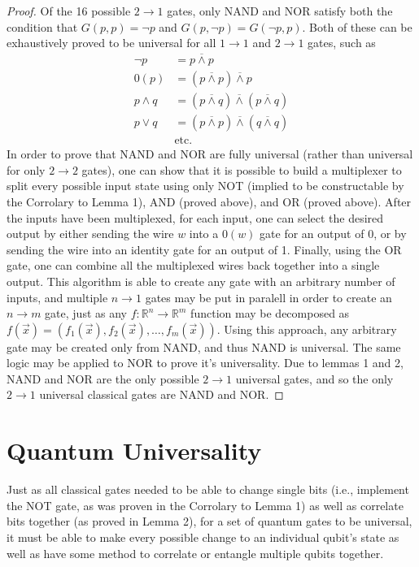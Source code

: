\documentclass[12pt]{article}
\newcommand{\nand}{\overline{\land}}
\begin{document}
\begin{proof}
    Of the 16 possible $2 \to 1$ gates, only NAND and NOR satisfy both the condition that $G(p, p) = \neg p$ and $G(p, \neg p) = G(\neg p, p)$.
    Both of these can be exhaustively proved to be universal for all $1 \to 1$ and $2 \to 1$ gates, such as
    \begin{align}
        \neg p &= p \nand p \\
        0(p) &= (p \nand p) \nand p \\
        p \land q &= (p \nand q) \nand (p \nand q) \\
        p \lor q &= (p \nand p) \nand (q \nand q) \\
        &\text{etc.}
    \end{align}
    In order to prove that NAND and NOR are fully universal (rather than universal for only $2 \to 2$ gates), one can show that it is possible to build a multiplexer to split every possible input state using only NOT (implied to be constructable by the Corrolary to Lemma 1), AND (proved above), and OR (proved above). After the inputs have been multiplexed, for each input, one can select the desired output by either sending the wire $w$ into a $0(w)$ gate for an output of 0, or by sending the wire into an identity gate for an output of 1. Finally, using the OR gate, one can combine all the multiplexed wires back together into a single output.
    This algorithm is able to create any gate with an arbitrary number of inputs, and multiple $n \to 1$ gates may be put in paralell in order to create an $n \to m$ gate, just as any $f: \mathbb{R}^n \to \mathbb{R}^m$ function may be decomposed as $f(\overrightarrow{x}) = (f_1(\overrightarrow{x}), f_2(\overrightarrow{x}), \dots, f_m(\overrightarrow{x}))$.
    Using this approach, any arbitrary gate may be created only from NAND, and thus NAND is universal. The same logic may be applied to NOR to prove it's universality. Due to lemmas 1 and 2, NAND and NOR are the only possible $2 \to 1$ universal gates, and so the only $2 \to 1$ universal classical gates are NAND and NOR.
\end{proof}

\section{Quantum Universality}
Just as all classical gates needed to be able to change single bits (i.e., implement the NOT gate, as was proven in the Corrolary to Lemma 1) as well as correlate bits together (as proved in Lemma 2), for a set of quantum gates to be universal, it must be able to make every possible change to an individual qubit's state as well as have some method to correlate or entangle multiple qubits together.
\end{document}
